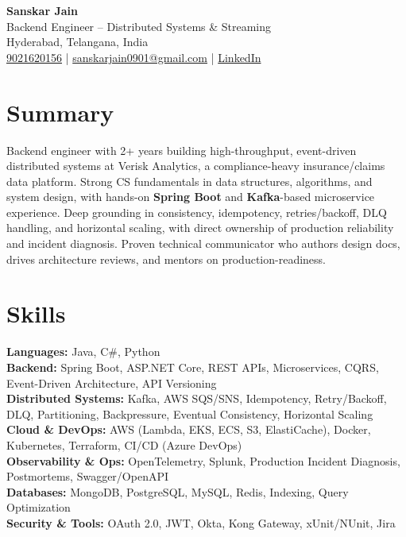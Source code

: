 \documentclass[a4paper,10pt]{article}
\begin{document}
\begin{center}
    {\LARGE \textbf{Sanskar Jain}} \\
    Backend Engineer -- Distributed Systems \& Streaming \\
    Hyderabad, Telangana, India \\
    \href{tel:9021620156}{9021620156} \;|\;
    \href{mailto:sanskarjain0901@gmail.com}{sanskarjain0901@gmail.com} \;|\;
    \href{https://www.linkedin.com/in/sanskar-jain0901/}{LinkedIn}
\end{center}

\vspace{1pt}

\section*{Summary}
Backend engineer with 2+ years building high-throughput, event-driven distributed systems at Verisk Analytics, a compliance-heavy insurance/claims data platform.
Strong CS fundamentals in data structures, algorithms, and system design, with hands-on \textbf{Spring Boot} and \textbf{Kafka}-based microservice experience.
Deep grounding in consistency, idempotency, retries/backoff, DLQ handling, and horizontal scaling, with direct ownership of production reliability and incident diagnosis.
Proven technical communicator who authors design docs, drives architecture reviews, and mentors on production-readiness.

\section*{Skills}
\textbf{Languages:} Java, C\#, Python \\
\textbf{Backend:} Spring Boot, ASP.NET Core, REST APIs, Microservices, CQRS, Event-Driven Architecture, API Versioning \\
\textbf{Distributed Systems:} Kafka, AWS SQS/SNS, Idempotency, Retry/Backoff, DLQ, Partitioning, Backpressure, Eventual Consistency, Horizontal Scaling \\
\textbf{Cloud \& DevOps:} AWS (Lambda, EKS, ECS, S3, ElastiCache), Docker, Kubernetes, Terraform, CI/CD (Azure DevOps) \\
\textbf{Observability \& Ops:} OpenTelemetry, Splunk, Production Incident Diagnosis, Postmortems, Swagger/OpenAPI \\
\textbf{Databases:} MongoDB, PostgreSQL, MySQL, Redis, Indexing, Query Optimization \\
\textbf{Security \& Tools:} OAuth 2.0, JWT, Okta, Kong Gateway, xUnit/NUnit, Jira
\end{document}
